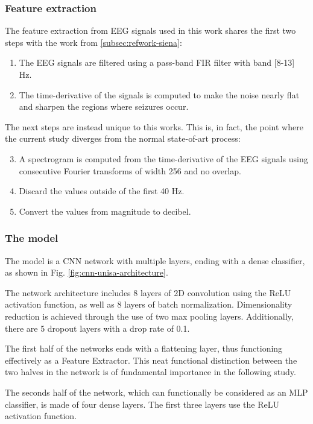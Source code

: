 \subsubsection{Feature extraction} \label{subsub:refwork-unisa-featext}
The feature extraction from \gls{EEG} signals used in this work shares the first two steps with the work from \ref{subsec:refwork-siena}:
\begin{enumerate}
    \item The \gls{EEG} signals are filtered using a pass-band \gls{FIR} filter with band [8-13] \unit{Hz}.
    \item The time-derivative of the signals is computed to make the noise nearly flat and sharpen the regions where seizures occur.
\end{enumerate}

The next steps are instead unique to this works. This is, in fact, the point where the current study diverges from the normal state-of-art process:
\begin{enumerate}
    \setcounter{enumi}{2}
    \item A spectrogram is computed from the time-derivative of the \gls{EEG} signals using consecutive Fourier transforms of width 256 and no overlap.
    \item Discard the values outside of the first 40 Hz.
    \item Convert the values from magnitude to decibel.
\end{enumerate}

\subsubsection{The model}
The model is a \gls{CNN} network with multiple layers, ending with a dense classifier, as shown in Fig. \ref{fig:cnn-unisa-architecture}.

The network architecture includes 8 layers of 2D convolution using the \gls{ReLU} activation function, as well as 8 layers of batch normalization. Dimensionality reduction is achieved through the use of two max pooling layers. Additionally, there are 5 dropout layers with a drop rate of 0.1. 

The first half of the networks ends with a flattening layer, thus functioning effectively as a Feature Extractor. This neat functional distinction between the two halves in the network is of fundamental importance in the following study.

The seconds half of the network, which can functionally be considered as an \gls{MLP} classifier, is made of four dense layers. The first three layers use the \gls{ReLU} activation function. 

